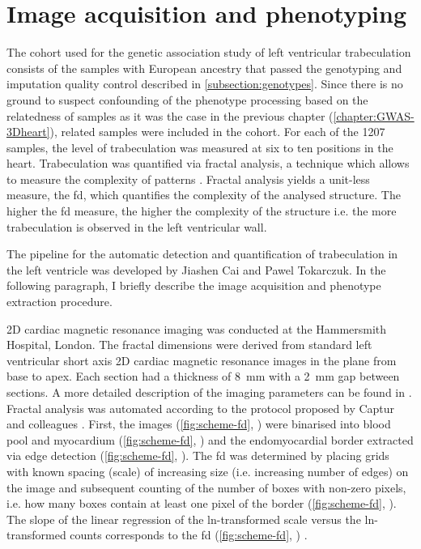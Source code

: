 \section{Image acquisition and phenotyping}
The cohort used for the genetic association study of left ventricular trabeculation consists of the samples with European ancestry that passed the genotyping and imputation quality control described in \cref{subsection:genotypes}. Since there is no ground to suspect confounding of the phenotype processing based on the relatedness of samples as it was the case in the previous chapter (\cref{chapter:GWAS-3Dheart}), related samples were included in the cohort. For each of the \num{1207} samples, the level of trabeculation was measured at six to ten positions in the heart. Trabeculation was quantified via fractal analysis, a technique which allows to measure the complexity of patterns \citep{Eke2002}. Fractal analysis yields a unit-less measure, the \gls{fd}, which quantifies the complexity of the analysed structure. The higher the \gls{fd} measure, the higher the complexity of the structure i.e. the more trabeculation is observed in the left ventricular wall. 

The pipeline for the automatic detection and quantification of trabeculation in the left ventricle was developed by Jiashen Cai and Pawel Tokarczuk. In the following paragraph, I briefly describe the image acquisition and phenotype extraction procedure. 

2D cardiac magnetic resonance imaging was conducted at the Hammersmith Hospital, London. The fractal dimensions were derived from standard left ventricular short axis 2D cardiac magnetic resonance images in the plane from base to apex. Each section had a thickness of \num{8}~mm with a \num{2}~mm gap between sections. A more detailed description of the imaging parameters can be found in \citep{deMarvao2014}. Fractal analysis was automated according to the protocol proposed by Captur and colleagues \citeyearpar{Captur2013}. First, the images (\cref{fig:scheme-fd}, ) were binarised into blood pool and myocardium (\cref{fig:scheme-fd}, ) and the endomyocardial border extracted via edge detection (\cref{fig:scheme-fd}, ). The \gls{fd} was determined by placing grids with known spacing (scale) of increasing size (i.e. increasing number of edges) on the image and subsequent counting of the number of boxes with non-zero pixels, i.e. how many boxes contain at least one pixel of the border (\cref{fig:scheme-fd}, ). The slope of the linear regression of the ln-transformed scale versus the ln-transformed counts corresponds to the \gls{fd} (\cref{fig:scheme-fd}, ) \citep{Captur2013}.

